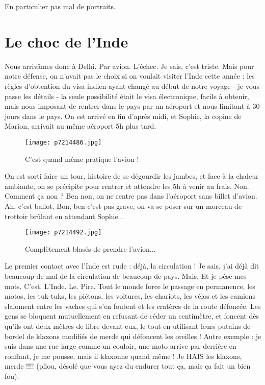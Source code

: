 \documentclass{book}
\begin{document}
 En particulier pas mal de portraits.

\chapter{Le choc de l'Inde}
Nous arrivâmes donc à Delhi. Par avion. L'échec. Je sais, c'est triste. Mais pour notre défense, on n'avait pas le choix si on voulait visiter l'Inde cette année : les règles d'obtention du visa indien ayant changé au début de notre voyage - je vous passe les détails - la seule possibilité était le visa électronique, facile à obtenir, mais nous imposant de rentrer dans le pays par un aéroport et nous limitant à 30 jours dans le pays. On est arrivé en fin d'après midi, et Sophie, la copine de Marion, arrivait au même aéroport 5h plus tard.


\begin{figure}[h]
\centering
\texttt{[image: p7214486.jpg]}
\caption*{C'est quand même pratique l'avion !}
\end{figure}

On est sorti faire un tour, histoire de se dégourdir les jambes, et face à la chaleur ambiante, on se précipite pour rentrer et attendre les 5h à venir au frais. Non. Comment ça non ? Ben non, on ne rentre pas dans l'aéroport sans billet d'avion. Ah, c'est ballot. Bon, ben c'est pas grave, on va se poser sur un morceau de trottoir brûlant en attendant Sophie...


\begin{figure}[h]
\centering
\texttt{[image: p7214492.jpg]}
\caption*{Complètement blasés de prendre l'avion...}
\end{figure}

Le premier contact avec l'Inde est rude : déjà, la circulation ! Je sais, j'ai déjà dit beaucoup de mal de la circulation de beaucoup de pays. Mais. Et je pèse mes mots. C'est. L'Inde. Le. Pire. Tout le monde force le passage en permanence, les motos, les tuk-tuks, les piétons, les voitures, les chariots, les vélos et les camions slaloment entre les vaches qui s'en foutent et les cratères de la route défoncée. Les gens se bloquent mutuellement en refusant de céder un centimètre, et foncent dès qu'ils ont deux mètres de libre devant eux, le tout en utilisant leurs putains de bordel de klaxons modifiés de merde qui défoncent les oreilles ! Autre exemple : je suis dans une rue large comme un couloir, une moto arrive par derrière en ronflant, je me pousse, mais il klaxonne quand même ! Je HAIS les klaxons, merde !!!! (pfiou, désolé que vous ayez du endurer tout ça, mais ça fait un bien fou).
\end{document}
